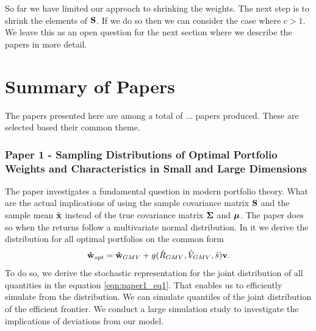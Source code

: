 \documentclass[]{book}\usepackage{knitr}
\begin{document}
So far we have limited our approach to shrinking the weights. 
The next step is to shrink the elements of $\mathbf{S}$.
If we do so then we can consider the case where $c>1$.
We leave this as an open question for the next section where we describe the papers in more detail.

\chapter{Summary of Papers}\label{ch:papersummary}


The papers presented here are among a total of ... papers produced. These are selected based their common theme.

\subsection*{Paper 1 - Sampling Distributions of Optimal Portfolio Weights and Characteristics in Small and Large Dimensions}\label{sec:paper1}
The paper investigates a fundamental question in modern portfolio theory. 
What are the actual implications of using the sample covariance matrix $\mathbf{S}$ and the sample mean $\bar{\mathbf{x}}$ instead of the true covariance matrix $\mathbf{\Sigma}$ and $\mbox{\boldmath$\mu$}$. 
The paper does so when the returns follow a multivariate normal distribution. 
In it we derive the distribution for all optimal portfolios on the common form
\begin{equation}\label{eqn:paper1_eq1}
  \mathbf{\hat{w}}_{opt} = \mathbf{\hat{w}}_{GMV} + g(\hat{R}_{GMV}, \hat{V}_{GMV}, \hat{s})\mathbf{v}.
\end{equation}
To do so, we derive the stochastic representation for the joint distribution of all quantities in the equation \eqref{eqn:paper1_eq1}. 
That enables us to efficiently simulate from the distribution. 
We can simulate quantiles of the joint distribution of the efficient frontier.
We conduct a large simulation study to investigate the implications of deviations from our model.
\end{document}

